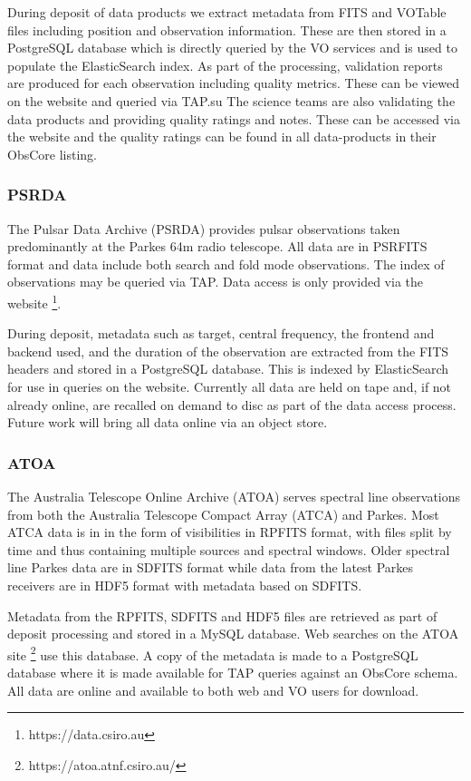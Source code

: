 \documentclass[11pt,a4paper]{ivoatex/ivoa}
\begin{document}
During deposit of data products we extract metadata from FITS and VOTable files including position and observation information.
These are then stored in a PostgreSQL database which is directly queried by the VO services and is used to populate the ElasticSearch index.
As part of the processing, validation reports are produced for each observation including quality metrics.
These can be viewed on the website and queried via TAP.su
The science teams are also validating the data products and providing quality ratings and notes.
These can be accessed via the website and the quality ratings can be found in all data-products in their ObsCore listing.

\subsubsection{PSRDA}

The Pulsar Data Archive (PSRDA) provides pulsar observations taken predominantly at the Parkes 64m radio telescope.
All data are in PSRFITS format and data include both search and fold mode observations.
The index of observations may be queried via TAP. Data access is only provided via the website \footnote{https://data.csiro.au}.

During deposit, metadata such as target, central frequency, the frontend and backend used, and the duration of the observation are extracted from the FITS headers and stored in a PostgreSQL database.
This is indexed by ElasticSearch for use in queries on the website.
Currently all data are held on tape and, if not already online, are recalled on demand to disc as part of the data access process.
Future work will bring all data online via an object store.

\subsubsection{ATOA}

The Australia Telescope Online Archive (ATOA) serves spectral line observations from both the Australia Telescope Compact Array (ATCA) and Parkes.
Most ATCA data is in in the form of visibilities in RPFITS format, with files split by time and thus containing multiple sources and spectral windows.
Older spectral line Parkes data are in SDFITS format while data from the latest Parkes receivers are in HDF5 format with metadata based on SDFITS.

Metadata from the RPFITS, SDFITS and HDF5 files are retrieved as part of deposit processing and stored in a MySQL database. Web searches on the ATOA site \footnote{https://atoa.atnf.csiro.au/} use this database.
A copy of the metadata is made to a PostgreSQL database where it is made available for TAP queries against an ObsCore schema. 
All data are online and available to both web and VO users for download.
\end{document}
